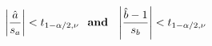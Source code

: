\documentclass[12pt]{article}
\begin{document}
\pagestyle{empty}
\Large
{}
\pagecolor{ehandbook}

\boldmath
\[
\left|\frac{\hat{a}}{s_a}\right| < t_{1-\alpha/2, \nu} \mbox{\bf  \,\, and \,\,} \left|\frac{\hat{b}-1}{s_b}\right| < t_{1-\alpha/2, \nu}
\]
\end{document}

